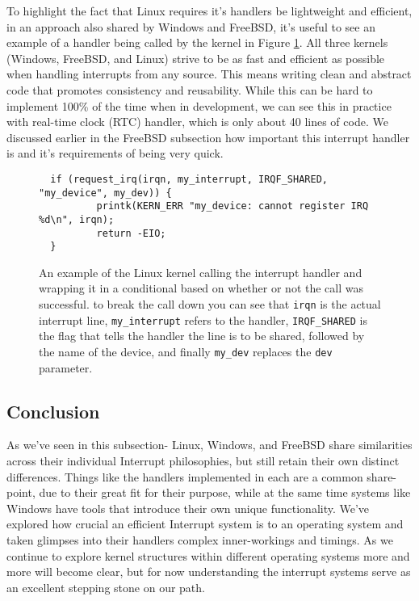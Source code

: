 \par To highlight the fact that Linux requires it's handlers be lightweight and efficient, in an approach also shared by Windows and FreeBSD, it's useful to see an example of a handler being called by the kernel in Figure \ref{code:linux_handler}.
All three kernels (Windows, FreeBSD, and Linux) strive to be as fast and efficient as possible when handling interrupts from any source.
This means writing clean and abstract code that promotes consistency and reusability.
While this can be hard to implement 100\% of the time when in development, we can see this in practice with real-time clock (RTC) handler, which is only about 40 lines of code.
We discussed earlier in the FreeBSD subsection how important this interrupt handler is and it's requirements of being very quick.


\begin{figure}[h]
\begin{lstlisting}
  if (request_irq(irqn, my_interrupt, IRQF_SHARED, "my_device", my_dev)) {
          printk(KERN_ERR "my_device: cannot register IRQ %d\n", irqn);
          return -EIO;
  }
\end{lstlisting}
\centering
\captionsetup{justification=centering}
\caption{
  An example of the Linux kernel calling the interrupt handler and wrapping it in a conditional based on whether or not the call was successful.
  to break the call down you can see that \texttt{irqn} is the actual interrupt line, \texttt{my\_interrupt} refers to the handler, \texttt{IRQF\_SHARED} is the flag that tells the handler the line is to be shared, followed by the name of the device, and finally \texttt{my\_dev} replaces the \texttt{dev} parameter.
}
\label{code:linux_handler}
\end{figure}

\subsection{Conclusion}
\label{sec:Conclusion}
\par As we've seen in this subsection- Linux, Windows, and FreeBSD share similarities across their individual Interrupt philosophies, but still retain their own distinct differences.
Things like the handlers implemented in each are a common share-point, due to their great fit for their purpose, while at the same time systems like Windows have tools that introduce their own unique functionality.
We've explored how crucial an efficient Interrupt system is to an operating system and taken glimpses into their handlers complex inner-workings and timings.
As we continue to explore kernel structures within different operating systems more and more will become clear, but for now understanding the interrupt systems serve as an excellent stepping stone on our path.
